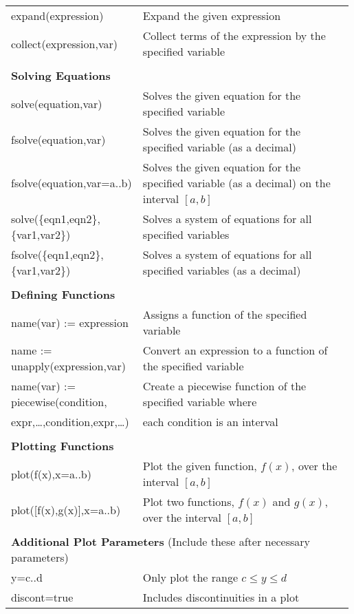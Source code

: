 \begin{fullwidth}
\begin{longtable}{p{0.33\linewidth} p{0.66\linewidth}}
    expand(expression) & Expand the given expression \\
    collect(expression,var) & Collect terms of the expression by the specified variable \\
          &  \\
    \multicolumn{2}{l}{\textbf{Solving Equations}} \\
    \hline
    solve(equation,var) & Solves the given equation for the specified variable \\
    fsolve(equation,var) & Solves the given equation for the specified variable (as a decimal) \\
    fsolve(equation,var=a..b) & Solves the given equation for the specified variable (as a decimal) on the interval $[a,b]$ \\
    solve(\{eqn1,eqn2\},\{var1,var2\}) & Solves a system of equations for all specified variables \\
    fsolve(\{eqn1,eqn2\},\{var1,var2\}) & Solves a system of equations for all specified variables (as a decimal) \\
          &  \\
    \multicolumn{2}{l}{\textbf{Defining Functions}} \\
    \hline
    name(var) := expression & Assigns a function of the specified variable \\
    name := unapply(expression,var) & Convert an expression to a function of the specified variable\\
    name(var) := piecewise(condition,
 & Create a piecewise function of the specified variable where\\
    \hspace{1.5cm}   expr,…,condition,expr,…) & each condition is an interval\\
          &  \\
    \multicolumn{2}{l}{\textbf{Plotting Functions}} \\
    \hline
    plot(f(x),x=a..b) & Plot the given function, $f(x)$, over the interval $[a,b]$ \\
    plot([f(x),g(x)],x=a..b) & Plot two functions, $f(x)$ and $g(x)$, over the interval $[a,b]$ \\
          &  \\
    \multicolumn{2}{l}{\quad\quad\textbf{Additional Plot Parameters} (Include these after necessary parameters)} \\
    \quad\quad y=c..d & Only plot the range $c \leq y \leq d$ \\
   \quad\quad discont=true & Includes discontinuities in a plot \\

\end{longtable}
\end{fullwidth}
